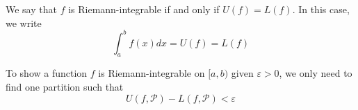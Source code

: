 \begin{definition}
    We say that $f$ is Riemann-integrable if and only if $U(f)=L(f)$. In this case, we write $$\int_a^b f(x) d x=U(f)=L(f)$$
    
    \noindent To show a function $f$ is Riemann-integrable on $[a, b)$ given $\varepsilon>0$, we only need to find one partition such that $$U(f, \mathcal{P})-L(f, \mathcal{P})<\varepsilon$$
\end{definition}